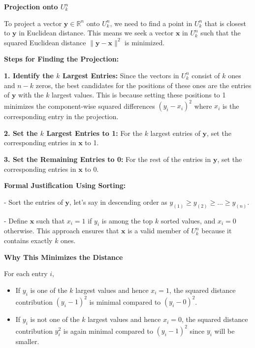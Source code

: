 \documentclass[8pt]{article}
\begin{document}
{\textbf{Projection onto \( U_k^n \)}

To project a vector \(\mathbf{y} \in \mathbb{R}^n\) onto \( U_k^n \), we need to find a point in \( U_k^n \) that is closest to \(\mathbf{y}\) in Euclidean distance. This means we seek a vector \(\mathbf{x}\) in \( U_k^n \) such that the squared Euclidean distance \(\|\mathbf{y} - \mathbf{x}\|^2\) is minimized.

\textbf{Steps for Finding the Projection:}

\textbf{1. Identify the \(k\) Largest Entries:}
   Since the vectors in \( U_k^n \) consist of \(k\) ones and \(n-k\) zeros, the best candidates for the positions of these ones are the entries of \(\mathbf{y}\) with the \(k\) largest values. This is because setting these positions to 1 minimizes the component-wise squared differences \((y_i - x_i)^2\) where \(x_i\) is the corresponding entry in the projection.

\textbf{2. Set the \(k\) Largest Entries to 1:}
   For the \(k\) largest entries of \(\mathbf{y}\), set the corresponding entries in \(\mathbf{x}\) to 1.

\textbf{3. Set the Remaining Entries to 0:}
   For the rest of the entries in \(\mathbf{y}\), set the corresponding entries in \(\mathbf{x}\) to 0.

\textbf{Formal Justification Using Sorting:}

- Sort the entries of \(\mathbf{y}\), let's say in descending order as \( y_{(1)} \geq y_{(2)} \geq \ldots \geq y_{(n)} \).

- Define \(\mathbf{x}\) such that \( x_i = 1 \) if \( y_i \) is among the top \(k\) sorted values, and \( x_i = 0 \) otherwise. This approach ensures that \(\mathbf{x}\) is a valid member of \( U_k^n \) because it contains exactly \(k\) ones.

\textbf{Why This Minimizes the Distance}

For each entry \(i\),
\begin{itemize}
    \item If \(y_i\) is one of the \(k\) largest values and hence \(x_i = 1\), the squared distance contribution \( (y_i - 1)^2 \) is minimal compared to \( (y_i - 0)^2 \).
    \item If \(y_i\) is not one of the \(k\) largest values and hence \(x_i = 0\), the squared distance contribution \( y_i^2 \) is again minimal compared to \( (y_i - 1)^2 \) since \(y_i\) will be smaller.
\end{itemize}

}
\end{document}
